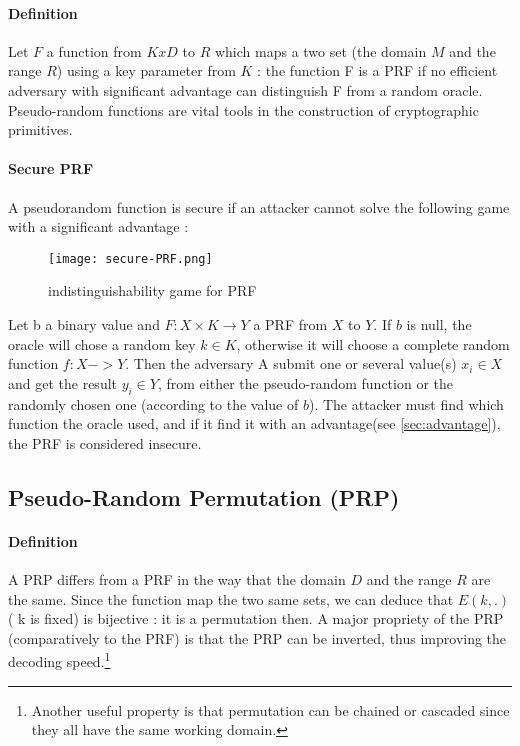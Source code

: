 \paragraph{Definition \\}
Let $F$ a function from $KxD$ to $R$ which maps a two set (the domain $M$ and the range $R$) using a key parameter from $K$ : the function F is a PRF if no efficient adversary with significant advantage can distinguish F from a random oracle. Pseudo-random functions are vital tools in the construction of cryptographic primitives.

\paragraph{Secure PRF \\}
\label{sec:IND-Game-PRF}

A pseudorandom function is secure if an attacker cannot solve the following game with a significant advantage :

\begin{figure}[h!]
	\centering
		\texttt{[image: secure-PRF.png]}
	\caption{indistinguishability game for PRF}
	\label{fig:Cipher}
\end{figure}

Let b a binary value and $F: X\times K \rightarrow Y$  a PRF from $X$ to $Y$. If $b$ is null, the oracle will chose a random key $k\in K$, otherwise it will choose a complete random function $f:X->Y$. Then the adversary A submit one or several value(s) $x_i \in X$ and get the result $y_i \in Y$, from either the pseudo-random function or the randomly chosen one (according to the value of $b$). The attacker must find which function the oracle used, and if it find it with an advantage(see \ref{sec:advantage}), the PRF is considered insecure.


\subsection{Pseudo-Random Permutation   (PRP)}


\paragraph{Definition \\}

A PRP differs from a PRF in the way that the domain $D$ and the range $R$ are the same. Since the function map the two same sets, we can deduce that $E(k,.)$ ( k is fixed) is bijective : it is a permutation then.
A major propriety of the PRP (comparatively to the PRF) is that the PRP can be inverted, thus improving the decoding speed.\footnote{Another useful property is that permutation can be chained or cascaded since they all have the same working domain.}


